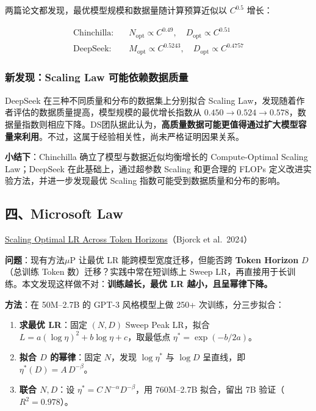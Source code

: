 \documentclass[
  11pt,
  a4paper,
  fontset=none]{ctexart}
\providecommand{\tightlist}{%
  \setlength{\itemsep}{0pt}\setlength{\parskip}{0pt}}
\newenvironment{NotesFormula}{%
  \par\noindent\begin{minipage}{\linewidth}%
  \setlength{\parindent}{2em}%
  \setlength{\parskip}{0.35em}%
}{\end{minipage}\par}
\begin{document}
\begin{NotesFormula}

两篇论文都发现，最优模型规模和数据量随计算预算近似以 \(C^{0.5}\) 增长：

\[\begin{aligned}
\text{Chinchilla:}\quad&N_{\mathrm{opt}}\propto C^{0.49},\quad D_{\mathrm{opt}}\propto C^{0.51}\\
\text{DeepSeek:}\quad&M_{\mathrm{opt}}\propto C^{0.5243},\quad D_{\mathrm{opt}}\propto C^{0.4757}
\end{aligned}\]

\end{NotesFormula}

\subsubsection{新发现：Scaling Law
可能依赖数据质量}\label{ux65b0ux53d1ux73b0scaling-law-ux53efux80fdux4f9dux8d56ux6570ux636eux8d28ux91cf}

DeepSeek 在三种不同质量和分布的数据集上分别拟合 Scaling
Law，发现随着作者评估的数据质量提高，模型规模的最优增长指数从
\(0.450\to0.524\to0.578\)，数据量指数则相应下降。DS团队据此认为，\textbf{高质量数据可能更值得通过扩大模型容量来利用}。不过，这属于经验相关性，尚未严格证明因果关系。

\textbf{小结下}：Chinchilla 确立了模型与数据近似均衡增长的
Compute-Optimal Scaling Law；DeepSeek 在此基础上，通过超参数 Scaling
和更合理的 FLOPs 定义改进实验方法，并进一步发现最优 Scaling
指数可能受到数据质量和分布的影响。

\clearpage

\subsection{四、Microsoft Law}\label{ux56dbmicrosoft-law}

\href{https://arxiv.org/abs/2409.19913}{Scaling Optimal LR Across Token
Horizons}（Bjorck et al.~2024）

\textbf{问题}：现有方法\(\mu\)P 让最优 LR 能跨模型宽度迁移，但能否跨
\textbf{Token Horizon} \(D\)（总训练 Token 数）迁移？实践中常在短训练上
Sweep LR，再直接用于长训练。本文发现这样做不对：\textbf{训练越长，最优
LR 越小，且呈幂律下降。}

\textbf{方法}：在 50M--2.7B 的 GPT-3 风格模型上做 250+
次训练，分三步拟合：

\begin{enumerate}
\def\labelenumi{\arabic{enumi}.}
\tightlist
\item
  \textbf{求最优 LR}：固定 \((N,D)\) Sweep Peak LR，拟合
  \(L=a(\log\eta)^2+b\log\eta+c\)，取最低点 \(\eta^*=\exp(-b/2a)\)。
\item
  \textbf{拟合 \(D\) 的幂律}：固定 \(N\)，发现 \(\log\eta^*\) 与
  \(\log D\) 呈直线，即 \(\eta^*(D)=A\,D^{-\beta}\)。
\item
  \textbf{联合 \(N,D\)}：设 \(\eta^*=C\,N^{-\alpha}D^{-\beta}\)，用
  760M--2.7B 拟合，留出 7B 验证（\(R^2=0.978\)）。
\end{enumerate}
\end{document}
